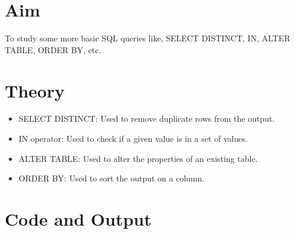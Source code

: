 \section{Aim}
 To study some more basic SQL queries like, SELECT DISTINCT, IN, ALTER TABLE, ORDER BY, etc.

\section{{Theory}}

\begin{itemize}
	\item SELECT DISTINCT: Used to remove duplicate rows from the output. 
	\item IN operator: Used to check if a given value is in a set of values.
	\item ALTER TABLE: Used to alter the properties of an existing table. 
	\item ORDER BY: Used to sort the output on a column. 
\end{itemize}

\section{{Code and Output}}


